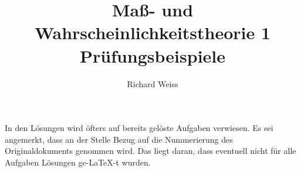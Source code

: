 \documentclass{article}
\title
{
  Maß- und Wahrscheinlichkeitstheorie 1 \\
  Prüfungsbeispiele
}
\author
{
  Richard Weiss
}
\date{}
\begin{document}
\maketitle

In den Lösungen wird öfters auf bereits gelöste Aufgaben verwiesen. Es sei angemerkt, dass an der Stelle Bezug auf die Nummerierung des Originaldokuments genommen wird. Das liegt daran, dass eventuell nicht für alle Aufgaben Lösungen ge-\LaTeX-t wurden.





\end{document}
